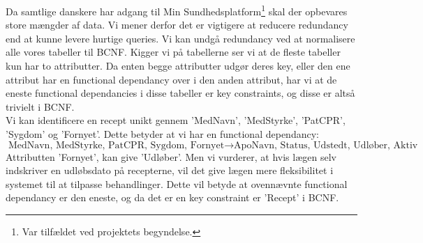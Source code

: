 Da samtlige danskere har adgang til Min Sundhedsplatform\footnote{Var tilfældet ved projektets begyndelse.} skal der opbevares store mængder af data. Vi mener derfor det er vigtigere at reducere redundancy end at kunne levere hurtige queries. Vi kan undgå redundancy ved at normalisere alle vores tabeller til BCNF. Kigger vi på tabellerne ser vi at de fleste tabeller kun har to attributter. Da enten begge attributter udgør deres key, eller den ene attribut har en functional dependancy over i den anden attribut, har vi at de eneste functional dependancies i disse tabeller er key constraints, og disse er altså trivielt i BCNF.\\
Vi kan identificere en recept unikt gennem 'MedNavn', 'MedStyrke', 'PatCPR', 'Sygdom' og 'Fornyet'. Dette betyder at vi har en functional dependancy:
\begin{equation*}
	\textrm{MedNavn, MedStyrke, PatCPR, Sygdom, Fornyet} \to \textrm{ApoNavn, Status, Udstedt, Udløber, Aktiv}
\end{equation*}
Attributten 'Fornyet', kan give 'Udløber'. Men vi vurderer, at hvis lægen selv indskriver en udløbsdato på recepterne, vil det give lægen mere fleksibilitet i systemet til at tilpasse behandlinger. Dette vil betyde at ovennævnte functional dependancy er den eneste, og da det er en key constraint er 'Recept' i BCNF. 

